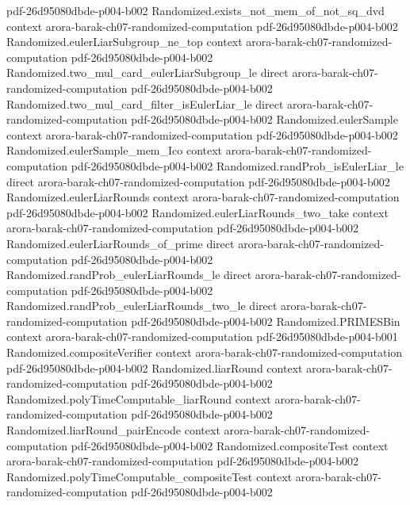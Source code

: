 \begin{theorem}
  {pdf-26d95080dbde-p004-b002}
\proofstep
  {Randomized.exists_not_mem_of_not_sq_dvd}
  {context}
  {arora-barak-ch07-randomized-computation}
  {pdf-26d95080dbde-p004-b002}
\proofstep
  {Randomized.eulerLiarSubgroup_ne_top}
  {context}
  {arora-barak-ch07-randomized-computation}
  {pdf-26d95080dbde-p004-b002}
\proofstep
  {Randomized.two_mul_card_eulerLiarSubgroup_le}
  {direct}
  {arora-barak-ch07-randomized-computation}
  {pdf-26d95080dbde-p004-b002}
\proofstep
  {Randomized.two_mul_card_filter_isEulerLiar_le}
  {direct}
  {arora-barak-ch07-randomized-computation}
  {pdf-26d95080dbde-p004-b002}
\proofstep
  {Randomized.eulerSample}
  {context}
  {arora-barak-ch07-randomized-computation}
  {pdf-26d95080dbde-p004-b002}
\proofstep
  {Randomized.eulerSample_mem_Ico}
  {context}
  {arora-barak-ch07-randomized-computation}
  {pdf-26d95080dbde-p004-b002}
\proofstep
  {Randomized.randProb_isEulerLiar_le}
  {direct}
  {arora-barak-ch07-randomized-computation}
  {pdf-26d95080dbde-p004-b002}
\proofstep
  {Randomized.eulerLiarRounds}
  {context}
  {arora-barak-ch07-randomized-computation}
  {pdf-26d95080dbde-p004-b002}
\proofstep
  {Randomized.eulerLiarRounds_two_take}
  {context}
  {arora-barak-ch07-randomized-computation}
  {pdf-26d95080dbde-p004-b002}
\proofstep
  {Randomized.eulerLiarRounds_of_prime}
  {direct}
  {arora-barak-ch07-randomized-computation}
  {pdf-26d95080dbde-p004-b002}
\proofstep
  {Randomized.randProb_eulerLiarRounds_le}
  {direct}
  {arora-barak-ch07-randomized-computation}
  {pdf-26d95080dbde-p004-b002}
\proofstep
  {Randomized.randProb_eulerLiarRounds_two_le}
  {direct}
  {arora-barak-ch07-randomized-computation}
  {pdf-26d95080dbde-p004-b002}
\proofstep
  {Randomized.PRIMESBin}
  {context}
  {arora-barak-ch07-randomized-computation}
  {pdf-26d95080dbde-p004-b001}
\proofstep
  {Randomized.compositeVerifier}
  {context}
  {arora-barak-ch07-randomized-computation}
  {pdf-26d95080dbde-p004-b002}
\proofstep
  {Randomized.liarRound}
  {context}
  {arora-barak-ch07-randomized-computation}
  {pdf-26d95080dbde-p004-b002}
\proofstep
  {Randomized.polyTimeComputable_liarRound}
  {context}
  {arora-barak-ch07-randomized-computation}
  {pdf-26d95080dbde-p004-b002}
\proofstep
  {Randomized.liarRound_pairEncode}
  {context}
  {arora-barak-ch07-randomized-computation}
  {pdf-26d95080dbde-p004-b002}
\proofstep
  {Randomized.compositeTest}
  {context}
  {arora-barak-ch07-randomized-computation}
  {pdf-26d95080dbde-p004-b002}
\proofstep
  {Randomized.polyTimeComputable_compositeTest}
  {context}
  {arora-barak-ch07-randomized-computation}
  {pdf-26d95080dbde-p004-b002}

\end{theorem}
